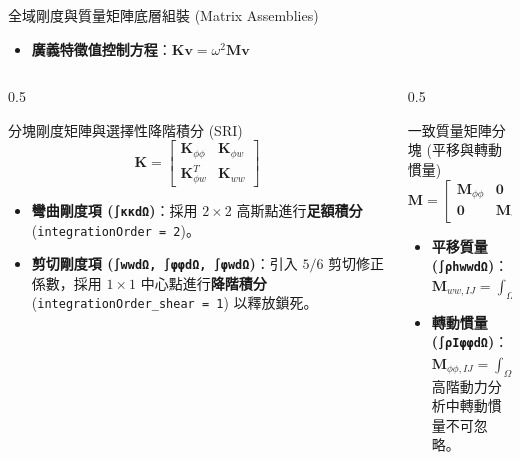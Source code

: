 \begin{frame}{全域剛度與質量矩陣底層組裝 (Matrix Assemblies)}
    \begin{itemize}
        \item \textbf{廣義特徵值控制方程}：$\mathbf{K}\mathbf{v} = \omega^2 \mathbf{M}\mathbf{v}$
    \end{itemize}
    \begin{columns}
        \begin{column}{0.5\textwidth}
            \begin{block}{分塊剛度矩陣與選擇性降階積分 (SRI)}
                $$\mathbf{K} = \begin{bmatrix} \mathbf{K}_{\phi\phi} & \mathbf{K}_{\phi w} \\ \mathbf{K}_{\phi w}^T & \mathbf{K}_{ww} \end{bmatrix}$$
                \begin{itemize}
                    \item \textbf{彎曲剛度項 (\texttt{∫κκdΩ})}：採用 $2 \times 2$ 高斯點進行\textbf{足額積分} (\texttt{integrationOrder = 2})。
                    \item \textbf{剪切剛度項 (\texttt{∫wwdΩ, ∫φφdΩ, ∫φwdΩ})}：引入 $5/6$ 剪切修正係數，採用 $1 \times 1$ 中心點進行\textbf{降階積分} (\texttt{integrationOrder\_shear = 1}) 以釋放鎖死。
                \end{itemize}
            \end{block}
        \end{column}
        \begin{column}{0.5\textwidth}
            \begin{block}{一致質量矩陣分塊 (平移與轉動慣量)}
                $$\mathbf{M} = \begin{bmatrix} \mathbf{M}_{\phi\phi} & \mathbf{0} \\ \mathbf{0} & \mathbf{M}_{ww} \end{bmatrix}$$
                \begin{itemize}
                    \item \textbf{平移質量 (\texttt{∫ρhwwdΩ})}：\\
                          $\mathbf{M}_{ww, IJ} = \int_{\Omega} \rho h N_I N_J d\Omega$
                    \item \textbf{轉動慣量 (\texttt{∫ρIφφdΩ})}：\\
                          $\mathbf{M}_{\phi\phi, IJ} = \int_{\Omega} \frac{\rho h^3}{12} N_I N_J d\Omega$ \\
                          \alert{高階動力分析中轉動慣量不可忽略}。
                \end{itemize}
            \end{block}
        \end{column}
    \end{columns}
\end{frame}
